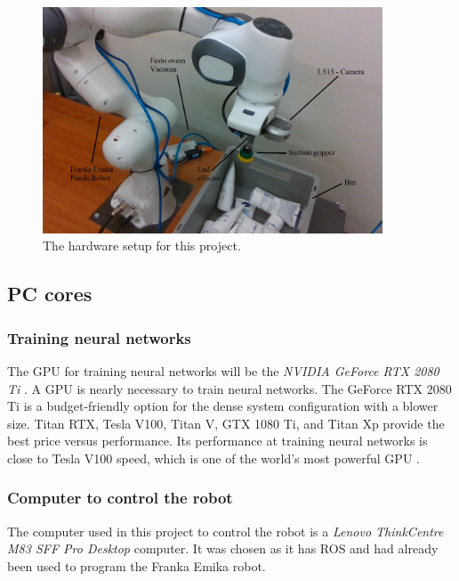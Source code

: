 \begin{figure}[h]
 \centering
 \includegraphics[width = 0.9\textwidth]{graphics/setup.jpg}
 \caption{The hardware setup for this project.}
 \label{fig:setupproject}
\end{figure}
\linespread{0}
\subsection{PC cores}
\vspace{0.8cm}
\subsubsection*{Training neural networks}
The GPU for training neural networks will be the \textit{NVIDIA GeForce RTX 2080 Ti} \cite{noauthor_graphics_nodate}.
A GPU is nearly necessary to train neural networks. The GeForce RTX 2080 Ti is a budget-friendly option for the dense system configuration with a blower size. Titan RTX, Tesla V100, Titan V, GTX 1080 Ti, and Titan Xp provide the best price versus performance. Its performance at training neural networks is close to Tesla V100 speed, which is one of the world's most powerful GPU \cite{balaban_deep_2018}. 

\subsubsection*{Computer to control the robot}
The computer used in this project to control the robot is a \textit{Lenovo ThinkCentre M83 SFF Pro Desktop} \cite{noauthor_thinkcentre_nodate} computer. It was chosen as it has ROS and had already been used to program the Franka Emika robot. 

\clearpage

